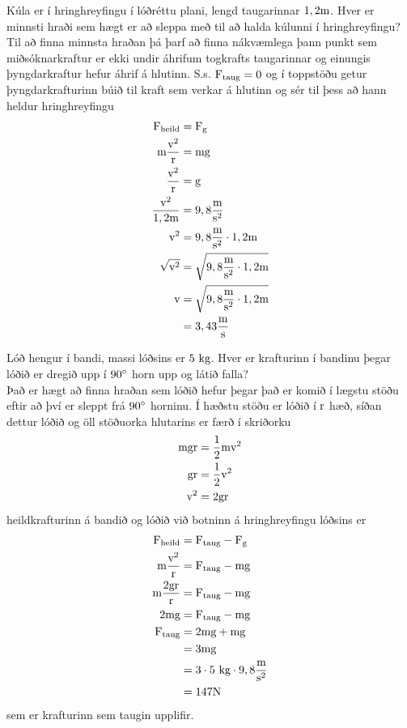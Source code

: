 \begin{formalexample}
Kúla er í hringhreyfingu í lóðréttu plani,
lengd taugarinnar $1,2 \textrm{m}$.
Hver er minnsti hraði sem hægt er að sleppa með til að halda kúlunni í hringhreyfingu?
\\[4 ex]
Til að finna minnsta hraðan þá þarf að finna nákvæmlega þann punkt sem
miðsóknarkraftur er ekki undir áhrifum togkrafts taugarinnar og einungis
þyngdarkraftur hefur áhrif á hlutinn. S.s. $\textrm{F}_\text{taug} = 0$ og
í toppstöðu getur þyngdarkrafturinn búið til kraft sem verkar á hlutinn og
sér til þess að hann heldur hringhreyfingu
\begin{align*}
	\textrm{F}_\text{heild} 
		&= \textrm{F}_\text{g}\\
	\textrm{m} \frac{\textrm{v}^2}{\textrm{r}} &= 
		\textrm{m} \textrm{g}\\
	\frac{\textrm{v}^2}{\textrm{r}} &= 
		\textrm{g}\\
	\frac{\textrm{v}^2}{1,2 \textrm{m}} &= 
		9,8 \frac{\textrm{m}}{\textrm{s}^2}\\
	\textrm{v}^2 &= 
		9,8 \frac{\textrm{m}}{\textrm{s}^2} \cdot 1,2 \textrm{m} \\
	\sqrt{ \textrm{v}^2 }  &= 
		\sqrt{ 9,8 \frac{\textrm{m}}{\textrm{s}^2} \cdot 1,2 \textrm{m} } \\
	\textrm{v}  &= 
		\sqrt{ 9,8 \frac{\textrm{m}}{\textrm{s}^2} \cdot 1,2 \textrm{m} } \\
	&=
		3,43 \frac{\textrm{m}}{\textrm{s}}
\end{align*}
\end{formalexample}
\begin{formalexample}
Lóð hengur í bandi, massi lóðsins
er $5 \textrm{ k}\textrm{g}$. Hver er krafturinn í bandinu þegar lóðið er
dregið upp í $90 ^{\circ}$ horn upp og látið falla?
\\[4 ex]
Það er hægt að finna hraðan sem lóðið hefur þegar það er komið í lægstu stöðu eftir
að því er sleppt frá $90^{\circ}$ horninu. Í hæðstu stöðu er lóðið
í $\textrm{r}$ hæð, síðan dettur lóðið og öll stöðuorka hlutarins er
færð í skriðorku
\begin{align*}
	\textrm{m} \textrm{g} \textrm{r}
		&= \frac{1}{2} \textrm{m} \textrm{v}^2\\
	\textrm{g} \textrm{r} 
		&= \frac{1}{2} \textrm{v}^2\\
	\textrm{v}^2 
		&= 2 \textrm{g} \textrm{r}
\end{align*}
heildkrafturinn á bandið og lóðið við botninn á hringhreyfingu lóðsins er
\begin{align*}
	\textrm{F}_\text{heild}
		&= \textrm{F}_\text{taug} - \textrm{F}_\text{g}\\
	\textrm{m} \frac{\textrm{v}^2}{\textrm{r}}
		&= \textrm{F}_\text{taug} - \textrm{m} \textrm{g}\\
	\textrm{m} \frac{2 \textrm{g} \textrm{r}}{\textrm{r}}
		&= \textrm{F}_\text{taug} - \textrm{m} \textrm{g}\\
	2 \textrm{m} \textrm{g}
		&= \textrm{F}_\text{taug} - \textrm{m} \textrm{g}\\
	\textrm{F}_\text{taug}
		&= 2 \textrm{m} \textrm{g} + \textrm{m} \textrm{g}\\
		&= 3 \textrm{m} \textrm{g} \\
		&= 3 \cdot 5 \textrm{ k}\textrm{g} \cdot 9,8 \frac{\textrm{m}}{\textrm{s}^2} \\
		&= 147 \textrm{N}
\end{align*}
sem er krafturinn sem taugin upplifir.
\end{formalexample}
